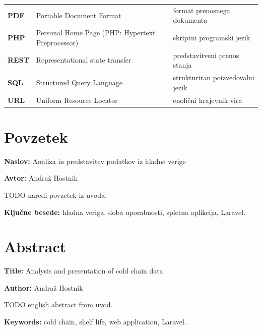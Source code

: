 \documentclass[a4paper, 12pt]{book}
\newcommand{\ttitle}{Analiza in predstavitev podatkov iz hladne verige}
\newcommand{\ttitleEn}{Analysis and presentation of cold chain data}
\newcommand{\tauthor}{Andraž Hostnik}
\newcommand{\tkeywords}{hladna veriga, doba uporabnosti, spletna aplikcija, Laravel}
\newcommand{\tkeywordsEn}{cold chain, shelf life, web application, Laravel}
\newcommand{\clearemptydoublepage}{\newpage{\pagestyle{empty}\cleardoublepage}}
\begin{document}
\begin{tabular}{p{}|p{}|p{}}
  {\bf PDF} & Portable Document Format & format prenosnega dokumenta \\
  {\bf PHP} & Personal Home Page (PHP: Hypertext Preprocessor) & skriptni programski jezik \\
  {\bf REST} & Representational state transfer & predstavitveni prenos stanja \\
  {\bf SQL} & Structured Query Language & strukturiran poizvedovalni jezik \\
  {\bf URL} & Uniform Resource Locator & enolični krajevnik vira \\
\end{tabular}


\clearemptydoublepage

\chapter*{Povzetek}

\noindent\textbf{Naslov:} \ttitle
\bigskip

\noindent\textbf{Avtor:} \tauthor
\bigskip

\noindent TODO naredi povzetek iz uvoda.

\bigskip

\noindent\textbf{Ključne besede:} \tkeywords.
\clearemptydoublepage

\chapter*{Abstract}

\noindent\textbf{Title:} \ttitleEn
\bigskip

\noindent\textbf{Author:} \tauthor
\bigskip

\noindent TODO english abstract from uvod.
\bigskip

\noindent\textbf{Keywords:} \tkeywordsEn.
\clearemptydoublepage

\mainmatter
\setcounter{page}{1}
\pagestyle{fancy}
\end{document}
